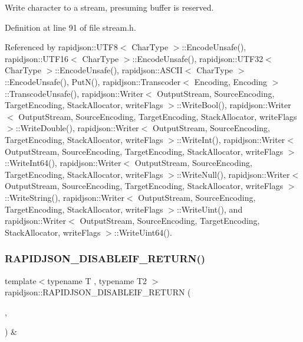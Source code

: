 Write character to a stream, presuming buffer is reserved. 



Definition at line 91 of file stream.\+h.


\begin{DoxyCode}{0}

\end{DoxyCode}


Referenced by rapidjson\+::\+U\+T\+F8$<$ Char\+Type $>$\+::\+Encode\+Unsafe(), rapidjson\+::\+U\+T\+F16$<$ Char\+Type $>$\+::\+Encode\+Unsafe(), rapidjson\+::\+U\+T\+F32$<$ Char\+Type $>$\+::\+Encode\+Unsafe(), rapidjson\+::\+A\+S\+C\+I\+I$<$ Char\+Type $>$\+::\+Encode\+Unsafe(), Put\+N(), rapidjson\+::\+Transcoder$<$ Encoding, Encoding $>$\+::\+Transcode\+Unsafe(), rapidjson\+::\+Writer$<$ Output\+Stream, Source\+Encoding, Target\+Encoding, Stack\+Allocator, write\+Flags $>$\+::\+Write\+Bool(), rapidjson\+::\+Writer$<$ Output\+Stream, Source\+Encoding, Target\+Encoding, Stack\+Allocator, write\+Flags $>$\+::\+Write\+Double(), rapidjson\+::\+Writer$<$ Output\+Stream, Source\+Encoding, Target\+Encoding, Stack\+Allocator, write\+Flags $>$\+::\+Write\+Int(), rapidjson\+::\+Writer$<$ Output\+Stream, Source\+Encoding, Target\+Encoding, Stack\+Allocator, write\+Flags $>$\+::\+Write\+Int64(), rapidjson\+::\+Writer$<$ Output\+Stream, Source\+Encoding, Target\+Encoding, Stack\+Allocator, write\+Flags $>$\+::\+Write\+Null(), rapidjson\+::\+Writer$<$ Output\+Stream, Source\+Encoding, Target\+Encoding, Stack\+Allocator, write\+Flags $>$\+::\+Write\+String(), rapidjson\+::\+Writer$<$ Output\+Stream, Source\+Encoding, Target\+Encoding, Stack\+Allocator, write\+Flags $>$\+::\+Write\+Uint(), and rapidjson\+::\+Writer$<$ Output\+Stream, Source\+Encoding, Target\+Encoding, Stack\+Allocator, write\+Flags $>$\+::\+Write\+Uint64().

\mbox{\label{namespacerapidjson_ad218ff941d55a64aaaea0c8658d4462f}} 
\subsubsection{\texorpdfstring{RAPIDJSON\_DISABLEIF\_RETURN()}{RAPIDJSON\_DISABLEIF\_RETURN()}\hspace{0.1cm}{\footnotesize\ttfamily [1/4]}}
{\footnotesize\ttfamily template$<$typename T , typename T2 $>$ \\
rapidjson\+::\+R\+A\+P\+I\+D\+J\+S\+O\+N\+\_\+\+D\+I\+S\+A\+B\+L\+E\+I\+F\+\_\+\+R\+E\+T\+U\+RN (\begin{DoxyParamCaption}\item[{(internal\+::\+Or\+Expr$<$ internal\+::\+Is\+Pointer$<$ T2 $>$, \mbox{\hyperlink{structrapidjson_1_1internal_1_1_is_generic_value}{internal\+::\+Is\+Generic\+Value}}$<$ T2 $>$ $>$)}]{,  }\item[{(typename T\+::\+Value\+Type \&)}]{ }\end{DoxyParamCaption}) \&}

